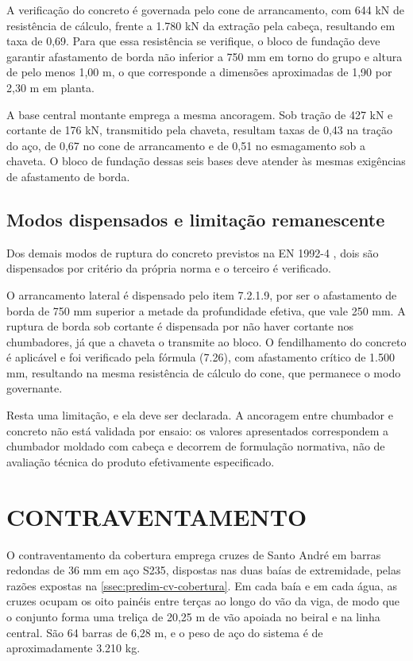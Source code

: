 A verificação do concreto é governada pelo cone de arrancamento, com 644 kN
de resistência de cálculo, frente a 1.780 kN da extração pela cabeça, resultando em
taxa de 0,69. Para que essa resistência se verifique, o bloco de fundação deve
garantir afastamento de borda não inferior a 750 mm em torno do grupo e altura de
pelo menos 1,00 m, o que corresponde a dimensões aproximadas de 1,90 por 2,30 m em
planta.

A base central montante emprega a mesma ancoragem. Sob tração de 427 kN e
cortante de 176 kN, transmitido pela chaveta, resultam taxas de 0,43 na
tração do aço, de 0,67 no cone de arrancamento e de 0,51 no esmagamento sob a
chaveta. O bloco de fundação dessas seis bases deve atender às mesmas exigências
de afastamento de borda.

\subsection{Modos dispensados e limitação remanescente}\label{ssec:ancoragem-pendencias}

Dos demais modos de ruptura do concreto previstos na
EN 1992-4 \cite{EN1992-4:2018}, dois são dispensados por critério da própria
norma e o terceiro é verificado.

O arrancamento lateral é dispensado pelo item 7.2.1.9, por ser o afastamento de
borda de 750 mm superior a metade da profundidade efetiva, que vale 250 mm. A
ruptura de borda sob cortante é dispensada por não haver cortante nos
chumbadores, já que a chaveta o transmite ao bloco. O fendilhamento do
concreto é aplicável e foi verificado pela fórmula (7.26), com afastamento crítico
de 1.500 mm, resultando na mesma resistência de cálculo do cone, que permanece o
modo governante.

Resta uma limitação, e ela deve ser declarada. A ancoragem entre chumbador e
concreto não está validada por ensaio: os valores apresentados correspondem a
chumbador moldado com cabeça e decorrem de formulação normativa, não de
avaliação técnica do produto efetivamente especificado.

\section{CONTRAVENTAMENTO}\label{sec:detalhe-contraventamento}

O contraventamento da cobertura emprega cruzes de Santo André em barras redondas
de 36 mm em aço S235, dispostas nas duas baías de extremidade, pelas razões
expostas na \autoref{ssec:predim-cv-cobertura}. Em cada baía e em cada água, as
cruzes ocupam os oito painéis entre terças ao longo do vão da viga, de modo que
o conjunto forma uma treliça de 20,25 m de vão apoiada no beiral e na linha
central. São 64 barras de 6,28 m, e o peso de aço do sistema é de
aproximadamente 3.210 kg.

